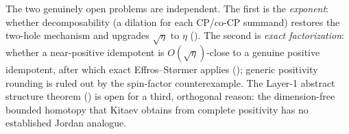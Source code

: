 The two genuinely open problems are independent. The first is the
\emph{exponent}: whether decomposability (a dilation for each CP/co-CP summand)
restores the two-hole mechanism and upgrades $\sqrt\eta$ to $\eta$
(). The second is \emph{exact factorization}: whether a
near-positive idempotent is $O(\sqrt\eta)$-close to a genuine positive
idempotent, after which exact Effros--St\o rmer applies
(); generic positivity rounding is ruled out by the
spin-factor counterexample. The Layer-1 abstract structure theorem
() is open for a third, orthogonal reason: the
dimension-free bounded homotopy that Kitaev obtains from complete positivity has
no established Jordan analogue.
